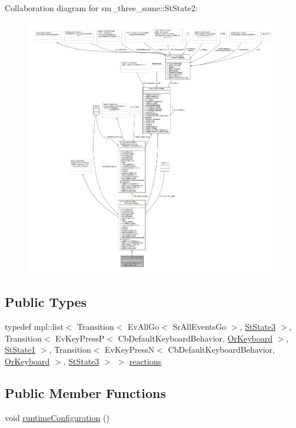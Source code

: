 Collaboration diagram for sm\+\_\+three\+\_\+some\+:\+:St\+State2\+:
\nopagebreak
\begin{figure}[H]
\begin{center}
\leavevmode
\includegraphics[width=350pt]{structsm__three__some_1_1StState2__coll__graph}
\end{center}
\end{figure}
\subsection*{Public Types}
\begin{DoxyCompactItemize}
\item 
typedef mpl\+::list$<$ Transition$<$ Ev\+All\+Go$<$ Sr\+All\+Events\+Go $>$, \hyperlink{structsm__three__some_1_1StState3}{St\+State3} $>$, Transition$<$ Ev\+Key\+PressP$<$ Cb\+Default\+Keyboard\+Behavior, \hyperlink{classsm__three__some_1_1OrKeyboard}{Or\+Keyboard} $>$, \hyperlink{structsm__three__some_1_1StState1}{St\+State1} $>$, Transition$<$ Ev\+Key\+PressN$<$ Cb\+Default\+Keyboard\+Behavior, \hyperlink{classsm__three__some_1_1OrKeyboard}{Or\+Keyboard} $>$, \hyperlink{structsm__three__some_1_1StState3}{St\+State3} $>$ $>$ \hyperlink{structsm__three__some_1_1StState2_ab4fa2f190482199ca04dd3aff5b90119}{reactions}
\end{DoxyCompactItemize}
\subsection*{Public Member Functions}
\begin{DoxyCompactItemize}
\item 
void \hyperlink{structsm__three__some_1_1StState2_a875f76ba61a102309b5dcbce2846ae75}{runtime\+Configuration} ()
\end{DoxyCompactItemize}
